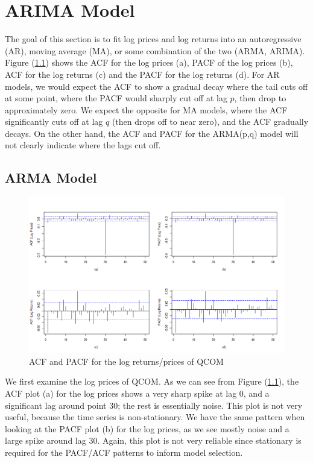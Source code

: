 \chapter{ARIMA Model}

The goal of this section is to fit log prices and log returns into an autoregressive (AR), moving average (MA), or some combination of the two (ARMA, ARIMA). Figure (\ref{fig:acf_pacf_log_price_returns}) shows the ACF for the log prices (a), PACF of the log prices (b), ACF for the log returns (c) and the PACF for the log returns (d). For AR models, we would expect the ACF to show a gradual decay where the tail cuts off at some point, where the PACF would sharply cut off at lag $p$, then drop to approximately zero. We expect the opposite for MA models, where the ACF significantly cuts off at lag $q$ (then drops off to near zero), and the ACF gradually decays. On the other hand, the ACF and PACF for the ARMA(p,q) model will not clearly indicate where the lags cut off. 

\section{ARMA Model}

\begin{figure}[h]
	\centering
	\includegraphics[width=1\linewidth]{content/plots/acf_pacf_log_price_returns.png}
	\caption{ACF and PACF for the log returns/prices of QCOM}
	\label{fig:acf_pacf_log_price_returns}
\end{figure}

We first examine the log prices of QCOM. As we can see from Figure (\ref{fig:acf_pacf_log_price_returns}), the ACF plot (a) for the log prices shows a very sharp spike at lag 0, and a significant lag around point 30; the rest is essentially noise. This plot is not very useful, because the time series is non-stationary. We have the same pattern when looking at the PACF plot (b) for the log prices, as we see mostly noise and a large spike around lag 30. Again, this plot is not very reliable since stationary is required for the PACF/ACF patterns to inform model selection. 

